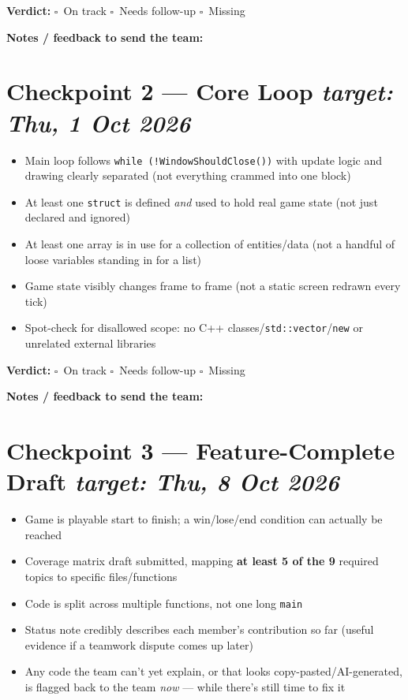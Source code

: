 \documentclass[11pt]{article}
\newcommand{\ybox}{$\square$\ }
\begin{document}
\textbf{Verdict:} \ybox On track \quad \ybox Needs follow-up \quad \ybox Missing

\medskip
\textbf{Notes / feedback to send the team:}\\[28pt]

\section*{Checkpoint 2 --- Core Loop \hfill {\small \itshape target: Thu, 1 Oct 2026}}

\begin{itemize}[leftmargin=1.4em,itemsep=3pt]
  \item[\ybox] Main loop follows \texttt{while (!WindowShouldClose())} with update logic and
        drawing clearly separated (not everything crammed into one block)
  \item[\ybox] At least one \texttt{struct} is defined \emph{and} used to hold real game state
        (not just declared and ignored)
  \item[\ybox] At least one array is in use for a collection of entities/data (not a handful of
        loose variables standing in for a list)
  \item[\ybox] Game state visibly changes frame to frame (not a static screen redrawn every tick)
  \item[\ybox] Spot-check for disallowed scope: no C++ classes/\texttt{std::vector}/\texttt{new}
        or unrelated external libraries
\end{itemize}

\textbf{Verdict:} \ybox On track \quad \ybox Needs follow-up \quad \ybox Missing

\medskip
\textbf{Notes / feedback to send the team:}\\[28pt]

\section*{Checkpoint 3 --- Feature-Complete Draft \hfill {\small \itshape target: Thu, 8 Oct 2026}}

\begin{itemize}[leftmargin=1.4em,itemsep=3pt]
  \item[\ybox] Game is playable start to finish; a win/lose/end condition can actually be reached
  \item[\ybox] Coverage matrix draft submitted, mapping \textbf{at least 5 of the 9} required
        topics to specific files/functions
  \item[\ybox] Code is split across multiple functions, not one long \texttt{main}
  \item[\ybox] Status note credibly describes each member's contribution so far (useful evidence
        if a teamwork dispute comes up later)
  \item[\ybox] Any code the team can't yet explain, or that looks copy-pasted/AI-generated, is
        flagged back to the team \emph{now} --- while there's still time to fix it
\end{itemize}
\end{document}
